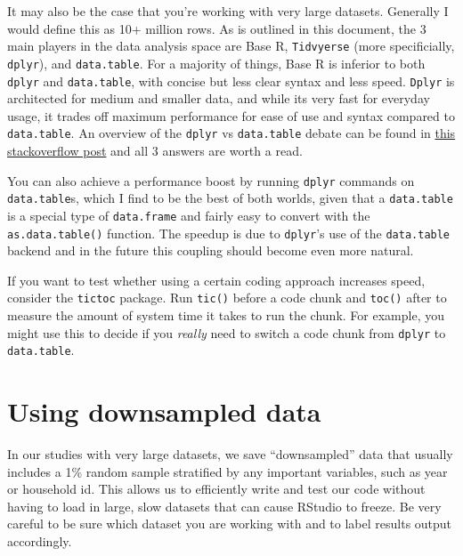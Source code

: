 \documentclass[]{book}
\begin{document}
It may also be the case that you're working with very large datasets. Generally I would define this as 10+ million rows. As is outlined in this document, the 3 main players in the data analysis space are Base R, \texttt{Tidvyerse} (more specificially, \texttt{dplyr}), and \texttt{data.table}. For a majority of things, Base R is inferior to both \texttt{dplyr} and \texttt{data.table}, with concise but less clear syntax and less speed. \texttt{Dplyr} is architected for medium and smaller data, and while its very fast for everyday usage, it trades off maximum performance for ease of use and syntax compared to \texttt{data.table}. An overview of the \texttt{dplyr} vs \texttt{data.table} debate can be found in \href{https://stackoverflow.com/questions/21435339/data-table-vs-dplyr-can-one-do-something-well-the-other-cant-or-does-poorly/27840349\#27840349}{this stackoverflow post} and all 3 answers are worth a read.

You can also achieve a performance boost by running \texttt{dplyr} commands on \texttt{data.table}s, which I find to be the best of both worlds, given that a \texttt{data.table} is a special type of \texttt{data.frame} and fairly easy to convert with the \texttt{as.data.table()} function. The speedup is due to \texttt{dplyr}'s use of the \texttt{data.table} backend and in the future this coupling should become even more natural.

If you want to test whether using a certain coding approach increases speed, consider the \texttt{tictoc} package. Run \texttt{tic()} before a code chunk and \texttt{toc()} after to measure the amount of system time it takes to run the chunk. For example, you might use this to decide if you \emph{really} need to switch a code chunk from \texttt{dplyr} to \texttt{data.table}.

\hypertarget{using-downsampled-data}{%
\section{Using downsampled data}\label{using-downsampled-data}}

In our studies with very large datasets, we save ``downsampled'' data that usually includes a 1\% random sample stratified by any important variables, such as year or household id. This allows us to efficiently write and test our code without having to load in large, slow datasets that can cause RStudio to freeze. Be very careful to be sure which dataset you are working with and to label results output accordingly.
\end{document}
